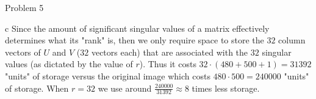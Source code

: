 \begin{section}{Problem 5}
    \newpage

    \begin{solution}{c}
        Since the amount of significant singular values of a matrix effectively determines what its "rank" is, then we only require space to store the $32$ column vectors of $U$ and $V$ ($32$ vectors each) that are associated with the $32$ singular values (as dictated by the value of $r$). Thus it costs $32 \cdot (480 + 500 + 1) = 31392$ "units" of storage versus the original image which costs $480 \cdot 500 = 240000$ "units" of storage. When $r = 32$ we use around $\frac{240000}{31392} \approx 8$ times less storage.
    \end{solution}
\end{section}